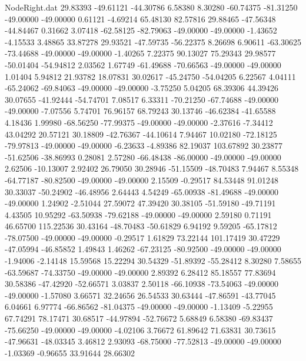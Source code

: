 \begin{filecontents}{NodeRight.dat}
  29.83393  -49.61121  -44.30786     6.58380    8.30280  -60.74375  -81.31250  -49.00000  -49.00000    0.61121   -4.69214   65.48130   82.57816
  29.88465  -47.56348  -44.84467     0.31662    3.07418  -62.58125  -82.79063  -49.00000  -49.00000   -1.43652   -4.15533    3.48865   33.87278
  29.93521  -47.59735  -56.22375     8.26698    6.90611  -63.30625  -73.44688  -49.00000  -49.00000   -1.40265    7.22375   90.13027   75.29343
  29.98577  -50.01404  -54.94812     2.03562    1.67749  -61.49688  -70.66563  -49.00000  -49.00000    1.01404    5.94812   21.93782   18.07831
  30.02617  -45.24750  -54.04205     6.22567    4.04111  -65.24062  -69.84063  -49.00000  -49.00000   -3.75250    5.04205   68.39306   44.39426
  30.07655  -41.92444  -54.74701     7.08517    6.33311  -70.21250  -67.74688  -49.00000  -49.00000   -7.07556    5.74701   76.96157   68.79243
  30.13746  -46.62384  -41.65588     4.18436    1.99980  -68.56250  -77.99375  -49.00000  -49.00000   -2.37616   -7.34412   43.04292   20.57121
  30.18809  -42.76367  -44.10614     7.94467   10.02180  -72.18125  -79.97813  -49.00000  -49.00000   -6.23633   -4.89386   82.19037  103.67892
  30.23877  -51.62506  -38.86993     0.28081    2.57280  -66.48438  -86.00000  -49.00000  -49.00000    2.62506  -10.13007    2.92402   26.79050
  30.28946  -51.15509  -48.70483     7.94467    8.55348  -64.77187  -80.82500  -49.00000  -49.00000    2.15509   -0.29517   84.53448   91.01248
  30.33037  -50.24902  -46.48956     2.64443    4.54249  -65.00938  -81.49688  -49.00000  -49.00000    1.24902   -2.51044   27.59072   47.39420
  30.38105  -51.59180  -49.71191     4.43505   10.95292  -63.50938  -79.62188  -49.00000  -49.00000    2.59180    0.71191   46.65700  115.22536
  30.43164  -48.70483  -50.61829     6.94192    9.59205  -65.17812  -78.07500  -49.00000  -49.00000   -0.29517    1.61829   73.22144  101.17419
  30.47229  -47.05994  -46.85852     1.49843    1.46262  -67.23125  -80.92500  -49.00000  -49.00000   -1.94006   -2.14148   15.59568   15.22294
  30.54329  -51.89392  -55.28412     8.30280    7.58655  -63.59687  -74.33750  -49.00000  -49.00000    2.89392    6.28412   85.18557   77.83694
  30.58386  -47.42920  -52.66571     3.03837    2.50118  -66.10938  -73.54063  -49.00000  -49.00000   -1.57080    3.66571   32.24656   26.54533
  30.63444  -47.86591  -43.77045     6.04661    6.97774  -66.86562  -81.04375  -49.00000  -49.00000   -1.13409   -5.22955   67.74291   78.17471
  30.68517  -44.97894  -52.76672     5.68849    6.58380  -69.83437  -75.66250  -49.00000  -49.00000   -4.02106    3.76672   61.89642   71.63831
  30.73615  -47.96631  -48.03345     3.46812    2.93093  -68.75000  -77.52813  -49.00000  -49.00000   -1.03369   -0.96655   33.91644   28.66302

\end{filecontents}
